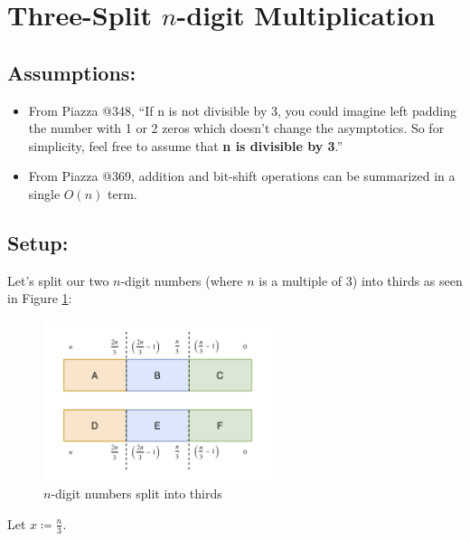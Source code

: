 \documentclass[conference]{styles/acmsiggraph}
\newcommand{\?}{\stackrel{?}{=}}
\begin{document}
\newpage


\section{Three-Split $n$-digit Multiplication}
\subsection{Assumptions:}
\begin{itemize}[label= ---]
    \item From Piazza @348, \enquote{If n is not divisible by 3, you could imagine left padding the number with 1 or 2 zeros which doesn't change the asymptotics. So for simplicity, feel free to assume that \textbf{n is divisible by 3}.}
    \item From Piazza @369, addition and bit-shift operations can be summarized in a single $O(n)$ term.
\end{itemize}

\subsection{Setup:} \label{section:setup}
Let's split our two $n$-digit numbers (where $n$ is a multiple of 3) into thirds as seen in Figure \ref{fig:thirds}:

\begin{figure}[h]
    \centering
    \includegraphics[width=0.6\textwidth]{Problem 5 Figures/CS124 PSET1_3 Diagrams.png}
    \caption{$n$-digit numbers split into thirds}
    \label{fig:thirds}
\end{figure}
\FloatBarrier

Let $x \coloneq \frac{n}{3}$.
\end{document}
